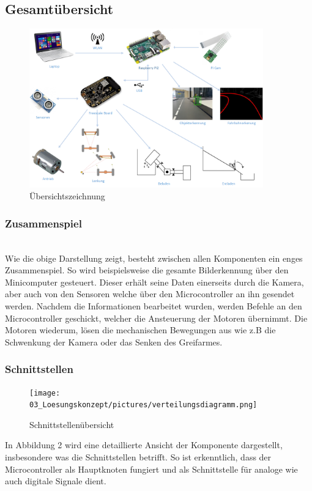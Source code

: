 \subsection{Gesamtübersicht}

\begin{figure}[h!]%
\centering
\includegraphics[width=0.9\textwidth]{03_Loesungskonzept/pictures/uebersichtszeichnung.png}
\caption{Übersichtszeichnung}
\label{fig:Java}
\end{figure}

\subsubsection{Zusammenspiel}\\[0.2cm]
Wie die obige Darstellung zeigt, besteht zwischen allen Komponenten ein enges Zusammenspiel.
So wird beispielsweise die gesamte Bilderkennung über den Minicomputer gesteuert. Dieser erhält seine Daten einerseits durch die Kamera, aber auch von den Sensoren welche über den Microcontroller an ihn gesendet werden. Nachdem die Informationen bearbeitet wurden, werden Befehle an den Microcontroller geschickt, welcher die Ansteuerung der Motoren übernimmt. Die Motoren wiederum, lösen die mechanischen Bewegungen aus wie z.B die Schwenkung der Kamera oder das Senken des Greifarmes.\\[0.2cm]
\subsubsection{Schnittstellen}
\begin{figure}[h!]%
\centering
\texttt{[image: 03\_Loesungskonzept/pictures/verteilungsdiagramm.png]}
\caption{Schnittstellenübersicht}
\label{fig:Java}
\end{figure}
In Abbildung 2 wird eine detaillierte Ansicht der Komponente dargestellt, insbesondere was die Schnittstellen betrifft. So ist erkenntlich, dass der Microcontroller als Hauptknoten fungiert und als Schnittstelle für analoge wie auch digitale Signale dient.